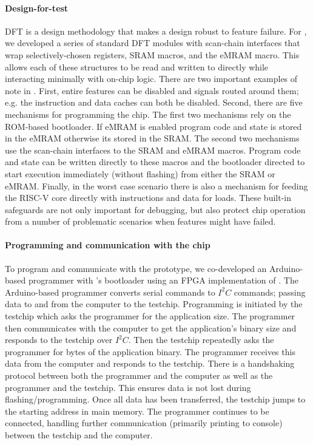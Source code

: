\paragraph{Design-for-test}
DFT is a design methodology that makes a design robust to feature failure.
% 
For \msilicon, we developed a series of standard DFT modules with scan-chain interfaces that wrap selectively-chosen registers, SRAM macros, and the eMRAM macro.
% 
This allows each of these structures to be read and written to directly while interacting minimally with on-chip logic.
% 
There are two important examples of note in \msilicon.
% 
First, entire features can be disabled and signals routed around them; e.g. the instruction and data caches can both be disabled.
% 
Second, there are five mechanisms for programming the chip.
% 
The first two mechanisms rely on the ROM-based bootloader.
% 
If eMRAM is enabled program code and state is stored in the eMRAM otherwise its stored in the SRAM.
% 
The second two mechanisms use the scan-chain interfaces to the SRAM and eMRAM macros.
% 
Program code and state can be written directly to these macros and the bootloader directed to start execution immediately (without flashing) from either the SRAM or eMRAM.
% 
Finally, in the worst case scenario there is also a mechanism for feeding the RISC-V core directly with instructions and data for loads.
% 
These built-in safeguards are not only important for debugging, but also protect chip operation from a number of problematic scenarios when features might have failed.

\paragraph{Programming and communication with the chip} 
To program and communicate with the \msilicon prototype, we co-developed an Arduino-based programmer with \msilicon's bootloader using an FPGA implementation of \msilicon.
% 
The Arduino-based programmer converts serial commands to $I^2 C$ commands; passing data to and from the computer to the testchip.
% 
Programming is initiated by the testchip which asks the programmer for the application size.
% 
The programmer then communicates with the computer to get the application's binary size and responds to the testchip over $I^2 C$.
% 
Then the testchip repeatedly asks the programmer for bytes of the application binary.
% 
The programmer receives this data from the computer and responds to the testchip.
% 
There is a handshaking protocol between both the programmer and the computer as well as the programmer and the testchip.
% 
This ensures data is not lost during flashing/programming.
% 
Once all data has been transferred, the testchip jumps to the starting address in main memory.
% 
The programmer continues to be connected, handling further communication (primarily printing to console) between the testchip and the computer.

